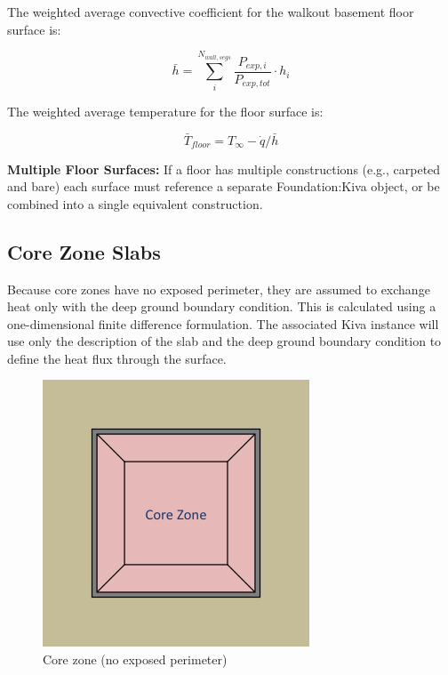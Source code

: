 The weighted average convective coefficient for the walkout basement
floor surface is:

\begin{equation}
\bar{h} = \sum^{N_{wall,segs}}_i{\frac{P_{exp,i}}{P_{exp,tot}}}\cdot h_i
\end{equation}

The weighted average temperature for the floor surface is:

\begin{equation}
\bar{T}_{floor} = T_\infty - \dot{q}/\bar{h}
\end{equation}

\textbf{Multiple Floor Surfaces:} If a floor has multiple constructions
(e.g., carpeted and bare) each surface must reference a separate
Foundation:Kiva object, or be combined into a single equivalent
construction.

\subsection{Core Zone Slabs}

Because core zones have no exposed perimeter, they are assumed to
exchange heat only with the deep ground boundary condition. This is
calculated using a one-dimensional finite difference formulation. The
associated Kiva instance will use only the description of the slab and
the deep ground boundary condition to define the heat flux through the
surface.

\begin{figure}
\centering
\includegraphics{media/kiva-core-zone.png}
\caption{Core zone (no exposed perimeter)\label{fig:cz}}
\end{figure}

